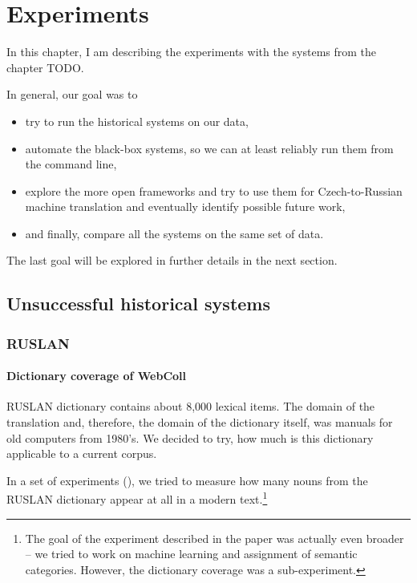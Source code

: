 \chapter{Experiments}
In this chapter, I am describing the experiments with the systems from the chapter TODO.

In general, our goal was to 
\begin{itemize}
\item try to run the historical systems on our data,
\item automate the black-box systems, so we can at least reliably run them from the command line,
\item explore the more open frameworks and try to use them for Czech-to-Russian machine translation and eventually identify possible future work,
\item and finally, compare all the systems on the same set of data.
\end{itemize}

The last goal will be explored in further details in the next section.

\section{Unsuccessful historical systems}

\subsection{RUSLAN}
\subsubsection{Dictionary coverage of WebColl}

RUSLAN dictionary contains about 8,000 lexical items. The domain of the translation and, therefore, the domain of the dictionary itself, was manuals for old computers from 1980's. We decided to try, how much is this dictionary applicable to a current corpus.

In a set of experiments (\cite{florida}), we tried to measure how many nouns from the RUSLAN dictionary appear at all in a modern text.\footnote{The goal of the experiment described in the paper was actually even broader -- we tried to work on machine learning and assignment of semantic categories. However, the dictionary coverage was a sub-experiment.} 

